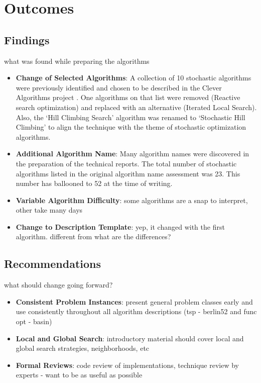 \documentclass[a4paper, 11pt]{article}
\begin{document}
% 
% 
\section{Outcomes}
\label{sec:outcomes}

% 
% 
\subsection{Findings}

what was found while preparing the algorithms

\begin{itemize}
	\item \textbf{Change of Selected Algorithms}: A  collection of 10 stochastic algorithms were previously identified and chosen to be described in the Clever Algorithms project \cite{Brownlee2010b}. One algorithms on that list were removed (Reactive search optimization) and replaced with an alternative (Iterated Local Search). Also, the `Hill Climbing Search' algorithm was renamed to `Stochastic Hill Climbing' to align the technique with the theme of stochastic optimization algorithms.
	\item \textbf{Additional Algorithm Name}: Many algorithm names were discovered in the preparation of the technical reports. The total number of stochastic algorithms listed in the original algorithm name assessment was 23. This number has ballooned to 52 at the time of writing.
	\item \textbf{Variable Algorithm Difficulty}: some algorithms are a snap to interpret, other take many days
	\item \textbf{Change to Description Template}: yep, it changed with the first algorithm. different from \cite{Brownlee2010a} what are the differences?
\end{itemize}


% 
% 
\subsection{Recommendations}

what should change going forward?

\begin{itemize}
	\item \textbf{Consistent Problem Instances}: present general problem classes early and use consistently throughout all algorithm descriptions (tsp - berlin52 and func opt - basin)
	\item \textbf{Local and Global Search}: introductory material should cover local and global search strategies, neighborhoods, etc
	\item \textbf{Formal Reviews}: code review of implementations, technique review by experts - want to be as useful as possible
\end{itemize}
\end{document}
